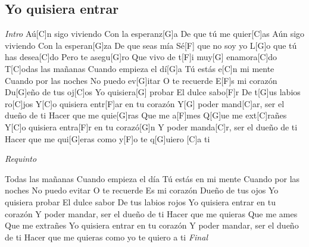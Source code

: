 \subsection{Yo quisiera entrar}
\noindent

\vspace{1cm}

\begin{guitar}
	\begin{multicols}{2}
		\textit{Intro}
		Aú[C]n sigo viviendo
		Con la esperanz[G]a
		De que tú me quier[C]as
	Aún sigo viviendo
	Con la esperan[G]za
	De que seas mía
	Sé[F] que no soy yo
	L[G]o que tú has desea[C]do
	Pero te asegu[G]ro
	Que vivo de t[F]i muy[G] enamora[C]do
	T[C]odas las mañanas
	Cuando empieza el dí[G]a
	Tú estás e[C]n mi mente
	Cuando por las noches
	No puedo ev[G]itar
	O te recuerde
	E[F]s mi corazón
	Du[G]eño de tus oj[C]os
	Yo quisiera[G] probar
	El dulce sabo[F]r
	De t[G]us labios ro[C]jos
	Y[C]o quisiera entr[F]ar en tu corazón
	Y[G] poder mand[C]ar, ser el dueño de ti
	Hacer que me quie[G]ras
	Que me a[F]mes
	Q[G]ue me ext[C]rañes
	Y[C]o quisiera entra[F]r en tu corazó[G]n
	Y poder manda[C]r, ser el dueño de ti
	Hacer que me qui[G]eras como y[F]o te q[G]uiero [C]a ti

	\par
	\textit{Requinto}
	\par

	Todas las mañanas
	Cuando empieza el día
	Tú estás en mi mente
	Cuando por las noches
	No puedo evitar
	O te recuerde
	Es mi corazón
	Dueño de tus ojos
	Yo quisiera probar
	El dulce sabor
	De tus labios rojos
	Yo quisiera entrar en tu corazón
	Y poder mandar, ser el dueño de ti
	Hacer que me quieras
	Que me ames
	Que me extrañes
	Yo quisiera entrar en tu corazón
	Y poder mandar, ser el dueño de ti
	Hacer que me quieras como yo te quiero a ti
		\textit{Final}
	\end{multicols}
\end{guitar}
